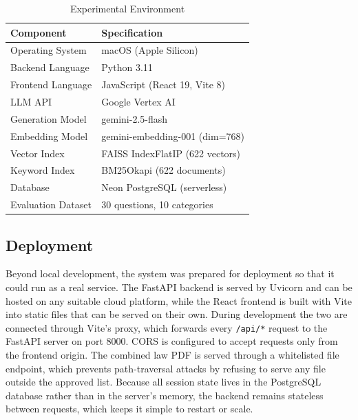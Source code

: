\begin{table}[H]
\centering
\caption{Experimental Environment}
\label{tab:exp_setup}
\begin{tabular}{ll}
\toprule
\textbf{Component} & \textbf{Specification} \\
\midrule
Operating System & macOS (Apple Silicon) \\
Backend Language & Python 3.11 \\
Frontend Language & JavaScript (React 19, Vite 8) \\
LLM API & Google Vertex AI \\
Generation Model & gemini-2.5-flash \\
Embedding Model & gemini-embedding-001 (dim=768) \\
Vector Index & FAISS IndexFlatIP (622 vectors) \\
Keyword Index & BM25Okapi (622 documents) \\
Database & Neon PostgreSQL (serverless) \\
Evaluation Dataset & 30 questions, 10 categories \\
\bottomrule
\end{tabular}
\end{table}

\subsection{Deployment}

\hs Beyond local development, the system was prepared for deployment so that it could run
as a real service. The FastAPI backend is served by Uvicorn and can be hosted on any
suitable cloud platform, while the React frontend is built with Vite into static files
that can be served on their own. During development the two are connected through Vite's
proxy, which forwards every \texttt{/api/*} request to the FastAPI server on port 8000.
CORS is configured to accept requests only from the frontend origin. The combined law PDF
is served through a whitelisted file endpoint, which prevents path-traversal attacks by
refusing to serve any file outside the approved list. Because all session state lives in
the PostgreSQL database rather than in the server's memory, the backend remains stateless
between requests, which keeps it simple to restart or scale.

\newpage

